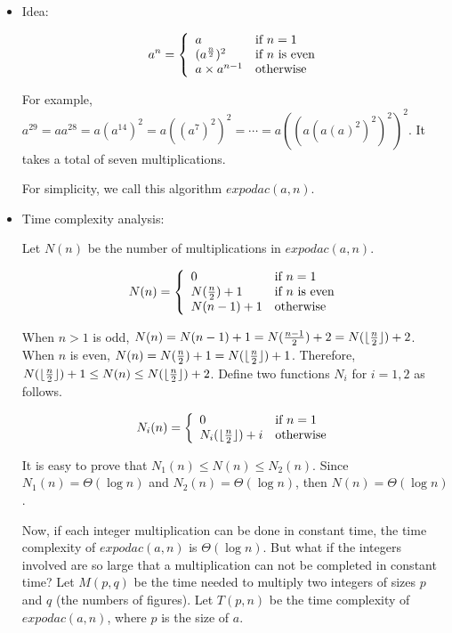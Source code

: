 \documentclass{article}
\begin{document}
\begin{itemize}

\item Idea:

$$a^n=\left\{\begin{array}{ll}
a & \mbox{if $n=1$}\\
(a^{n\over2})^2 & \mbox{if $n$ is even}\\
a\times a^{n-1} & \mbox{otherwise}
\end{array}\right.$$

For example, $a^{29}=aa^{28}=a(a^{14})^2=a((a^7)^2)^2=\cdots=
a((a(a(a)^2)^2)^2)^2$.
It takes a total of seven multiplications.

For simplicity, we call this algorithm $expodac(a,n)$.

\item Time complexity analysis:

Let $N(n)$ be the number of multiplications in $expodac(a,n)$.

$$N(n)=\left\{\begin{array}{ll}
0 & \mbox{if $n=1$}\\
N({n\over2})+1 & \mbox{if $n$ is even}\\
N(n-1)+1 & \mbox{otherwise}
\end{array}\right.$$

When $n>1$ is odd, $N(n)=N(n-1)+1=N({n-1\over2})+2=N(\lfloor{n\over2}
\rfloor)+2$. When $n$ is even, $N(n)=N({n\over2})+1=N(\lfloor{n\over2}
\rfloor)+1$. Therefore, $N(\lfloor{n\over2}\rfloor)+1\le N(n)\le
N(\lfloor{n\over2}\rfloor)+2$. Define two functions $N_i$ for
$i=1,2$ as follows.

$$N_i(n)=\left\{\begin{array}{ll}
0 & \mbox{if $n=1$}\\
N_i(\lfloor{n\over2}\rfloor)+i & \mbox{otherwise}
\end{array}\right.$$

It is easy to prove that $N_1(n)\le N(n)\le N_2(n)$. Since
$N_1(n)=\Theta(\log n)$ and $N_2(n)=\Theta(\log n)$, then
$N(n)=\Theta(\log n)$.

Now, if each integer multiplication can be done in constant time, 
the time complexity of $expodac(a,n)$ is $\Theta(\log n)$. But
what if the integers involved are so large that a multiplication
can not be completed in constant time?
Let $M(p,q)$ be the time needed to multiply two integers of
sizes $p$ and $q$ (the numbers of figures). 
Let $T(p,n)$ be the time complexity of $expodac(a,n)$,
where $p$ is the size of $a$.


\end{itemize}
\end{document}
